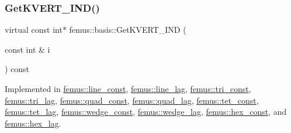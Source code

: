 \mbox{\label{classfemus_1_1basis_a95ceb3feae4c484b0baa6a4d35d38909}} 
\subsubsection{\texorpdfstring{Get\+K\+V\+E\+R\+T\+\_\+\+I\+N\+D()}{GetKVERT\_IND()}}
{\footnotesize\ttfamily virtual const int$\ast$ femus\+::basis\+::\+Get\+K\+V\+E\+R\+T\+\_\+\+I\+ND (\begin{DoxyParamCaption}\item[{const int \&}]{i }\end{DoxyParamCaption}) const\hspace{0.3cm}{\ttfamily [pure virtual]}}



Implemented in \mbox{\hyperlink{classfemus_1_1line__const_a6fd1093aa51a8db78167a9b0ab684a4d}{femus\+::line\+\_\+const}}, \mbox{\hyperlink{classfemus_1_1line__lag_af8c8c5450968f7e99f0229743c3098c8}{femus\+::line\+\_\+lag}}, \mbox{\hyperlink{classfemus_1_1tri__const_a3fd58ad3e2cc9c37e4a92fcab3b11a20}{femus\+::tri\+\_\+const}}, \mbox{\hyperlink{classfemus_1_1tri__lag_a16e3ec116476466d968402ba961917b4}{femus\+::tri\+\_\+lag}}, \mbox{\hyperlink{classfemus_1_1quad__const_a1254abf3bc41679deaa514fcd63138a0}{femus\+::quad\+\_\+const}}, \mbox{\hyperlink{classfemus_1_1quad__lag_ab5c2233d78efd00452fabdaf9eb5c942}{femus\+::quad\+\_\+lag}}, \mbox{\hyperlink{classfemus_1_1tet__const_a45c865d95f6a98e297d24d50893942b3}{femus\+::tet\+\_\+const}}, \mbox{\hyperlink{classfemus_1_1tet__lag_a6fe6b8ef67dd6799487fc1acff5b36de}{femus\+::tet\+\_\+lag}}, \mbox{\hyperlink{classfemus_1_1wedge__const_a5b8d6664b44889cea478a6c5c68126d1}{femus\+::wedge\+\_\+const}}, \mbox{\hyperlink{classfemus_1_1wedge__lag_ac966f6d982d2a0aa7231ae1a5e731800}{femus\+::wedge\+\_\+lag}}, \mbox{\hyperlink{classfemus_1_1hex__const_a085fcb241d0ab952117945bcdd27215b}{femus\+::hex\+\_\+const}}, and \mbox{\hyperlink{classfemus_1_1hex__lag_a86a146b7f3f4b8af3b41f86f028e0ac2}{femus\+::hex\+\_\+lag}}.

\mbox{\label{classfemus_1_1basis_a00597122bbc75877f1c184f8fce4986c}} 
